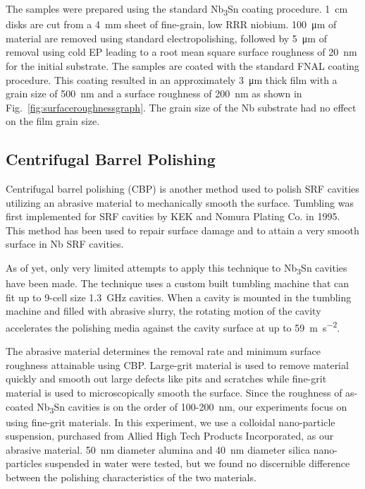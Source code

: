 \documentclass[reprint,amsmath,amssymb,aps]{revtex4-2}%
\begin{document}
The samples were prepared using the standard Nb\textsubscript{3}Sn coating procedure. 1~\unit{\centi\metre} disks are cut from a 4~\unit{\milli\metre} sheet of fine-grain, low RRR niobium. 100~\unit{\micro\metre} of material are removed using standard electropolishing\cite{saito2003development}, followed by 5~\unit{\micro\metre} of removal using cold EP leading to a root mean square surface roughness of 20~nm for the initial substrate.\cite{crawford2017extreme} The samples are coated with the standard FNAL coating procedure.\cite{posen2017nb3sn} This coating resulted in an approximately 3~\unit{\micro\metre} thick film with a grain size of 500~\unit{\nano\metre} and a surface roughness of 200~nm as shown in Fig.~\ref{fig:surfaceroughnessgraph}. The grain size of the Nb substrate had no effect on the film grain size.
%
\subsection{Centrifugal Barrel Polishing}%
\label{subsec:CentrifugalBarrelPolishing}%
Centrifugal barrel polishing (CBP) is another method used to polish SRF cavities utilizing an abrasive material to mechanically smooth the surface. Tumbling was first implemented for SRF cavities by KEK and Nomura Plating Co. in 1995\cite{higuchi1996investigation}. This method has been used to repair surface damage and to attain a very smooth surface in Nb SRF cavities\cite{cooper2012mirror, cooper2011centrifugal}. 

As of yet, only very limited attempts to apply this technique to Nb\textsubscript{3}Sn cavities have been made. The technique uses a custom built tumbling machine that can fit up to 9-cell size 1.3~GHz cavities. When a cavity is mounted in the tumbling machine and filled with abrasive slurry, the rotating motion of the cavity accelerates the polishing media against the cavity surface at up to 59~\unit{\metre\per\square\second}. 

The abrasive material determines the removal rate and minimum surface roughness attainable using CBP. Large-grit material is used to remove material quickly and smooth out large defects like pits and scratches while fine-grit material is used to microscopically smooth the surface. Since the roughness of as-coated Nb\textsubscript{3}Sn cavities is on the order of 100-200~nm, our experiments focus on using fine-grit materials. In this experiment, we use a colloidal nano-particle suspension, purchased from Allied High Tech Products Incorporated, as our abrasive material. 50~nm diameter alumina and 40~nm diameter silica nano-particles suspended in water were tested, but we found no discernible difference between the polishing characteristics of the two materials.
\end{document}
